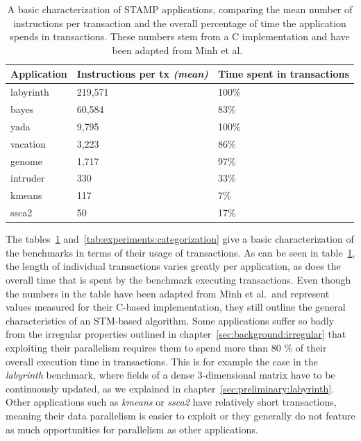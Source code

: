 \begin{table}
    \centering
    \begin{tabular}{|l|l|l|}
        \hline
        \textbf{Application} & \textbf{Instructions per tx} \emph{(mean)} & \textbf{Time spent in transactions}\\\hline\hline
        labyrinth & 219,571 & 100\%\\\hline
        bayes & 60,584 & 83\%\\\hline
        yada & 9,795 & 100\%\\\hline
        vacation & 3,223 & 86\%\\\hline
        genome & 1,717 & 97\%\\\hline
        intruder & 330 & 33\%\\\hline
        kmeans & 117 & 7\%\\\hline
        ssca2 & 50 & 17\%\\\hline
    \end{tabular}
    \caption{A basic characterization of STAMP applications, comparing the mean number of instructions per transaction and the overall percentage of time the application spends in transactions. These numbers stem from a C implementation and have been adapted from Minh et al.~\cite{minh2008stamp}}
    \label{tab:experiments:overview}
\end{table}

The tables~\ref{tab:experiments:overview} and~\ref{tab:experiments:categorization} give a basic characterization of the benchmarks in terms of their usage of transactions.
As can be seen in table~\ref{tab:experiments:overview}, the length of individual transactions varies greatly per application, as does the overall time that is spent by the benchmark executing transactions.
Even though the numbers in the table have been adapted from Minh et al.\ and represent values measured for their C-based implementation, they still outline the general characteristics of an STM-based algorithm.
Some applications suffer so badly from the irregular properties outlined in chapter~\ref{sec:background:irregular} that exploiting their parallelism requires them to spend more than 80 \% of their overall execution time in transactions.
This is for example the case in the \emph{labyrinth} benchmark, where fields of a dense 3-dimensional matrix have to be continuously updated, as we explained in chapter~\ref{sec:preliminary:labyrinth}.
Other applications such as \emph{kmeans} or \emph{ssca2} have relatively short transactions, meaning their data parallelism is easier to exploit or they generally do not feature as much opportunities for parallelism as other applications.

